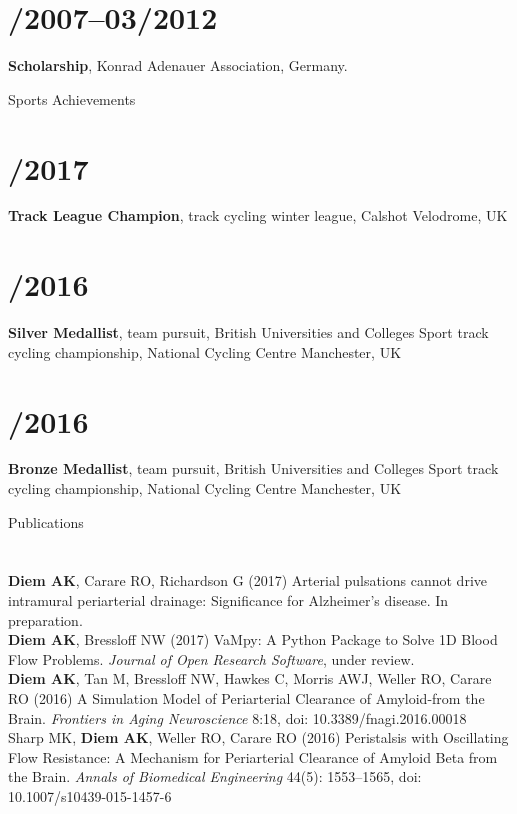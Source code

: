 \documentclass[margin,line]{res}
\begin{document}
\begin{resume}
\section{/2007--03/2012}{\bf Scholarship}, Konrad Adenauer Association, Germany.\\        

\vspace*{-.2in}

{\sc Sports Achievements}\\
\vspace*{-.35in}
\section{/2017}{\bf Track League Champion}, track cycling winter league, Calshot Velodrome, UK\\
\vspace*{-.35in}
\section{/2016}{\bf Silver Medallist}, team pursuit, British Universities and Colleges Sport track cycling championship, National Cycling Centre Manchester, UK\\        
\vspace*{-.35in}
\section{/2016}{\bf Bronze Medallist}, team pursuit, British Universities and Colleges Sport track cycling championship, National Cycling Centre Manchester, UK\\

\vspace*{-.2in}

{\sc Publications}\\
\vspace*{-.35in}
\section{}
{\bf Diem AK}, Carare RO, Richardson G (2017) Arterial pulsations cannot drive intramural periarterial drainage: Significance for Alzheimer's disease. In preparation.\\
{\bf Diem AK}, Bressloff NW (2017) VaMpy: A Python Package to Solve 1D Blood Flow Problems. {\em Journal of Open Research Software}, under review.\\
{\bf Diem AK}, Tan M, Bressloff NW, Hawkes C, Morris AWJ, Weller RO, Carare RO (2016) A Simulation Model of Periarterial Clearance of Amyloid-\textbeta from the Brain. \textit{Frontiers in Aging Neuroscience} 8:18, doi: 10.3389/fnagi.2016.00018\\
Sharp MK, {\bf Diem AK}, Weller RO, Carare RO (2016) Peristalsis with Oscillating Flow Resistance: A Mechanism for Periarterial Clearance of Amyloid Beta from the Brain. \textit{Annals of Biomedical Engineering} 44(5): 1553--1565, doi: 10.1007/s10439-015-1457-6\\


\end{resume}
\end{document}
